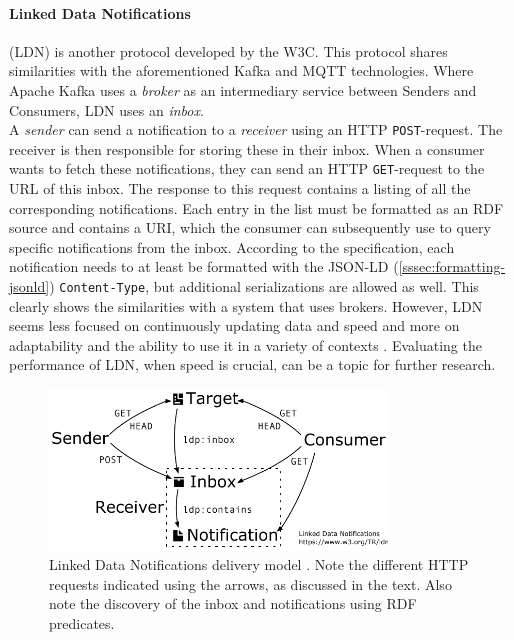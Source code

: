 \paragraph{Linked Data Notifications} \cite{LDN,capadisli2017linked} (LDN) is another protocol developed by the W3C. This protocol shares similarities with the aforementioned Kafka and MQTT technologies. Where Apache Kafka uses a \emph{broker} as an intermediary service between Senders and Consumers, LDN uses an \emph{inbox}.\\

\noindent A \emph{sender} can send a notification to a \emph{receiver} using an HTTP \texttt{POST}-request. The receiver is then responsible for storing these in their inbox. When a consumer wants to fetch these notifications, they can send an HTTP \texttt{GET}-request to the URL of this inbox. The response to this request contains a listing of all the corresponding notifications. Each entry in the list must be formatted as an RDF source and contains a URI, which the consumer can subsequently use to query specific notifications from the inbox. According to the specification, each notification needs to at least be formatted with the JSON-LD (\cref{sssec:formatting-jsonld}) \texttt{Content-Type}, but additional serializations are allowed as well. This clearly shows the similarities with a system that uses brokers. However, LDN seems less focused on continuously updating data and speed and more on adaptability and the ability to use it in a variety of contexts \cite{capadisli2017linked}. Evaluating the performance of LDN, when speed is crucial, can be a topic for further research.

\begin{figure}[htbp!]
    \centering
    \includegraphics[width=0.8\textwidth]{images/ldn.pdf}
    \caption{Linked Data Notifications delivery model \cite{capadisli2017linked}. Note the different HTTP requests indicated using the arrows, as discussed in the text. Also note the discovery of the inbox and notifications using RDF predicates.}
    \label{fig:LDN}
\end{figure}

